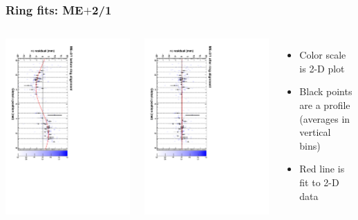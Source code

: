 \documentclass[compress]{beamer}
\begin{document}
\begin{frame}
\frametitle{Ring fits: ME$+$2/1}
\vfill
\begin{columns}
\includegraphics[height=\linewidth, angle=90]{ringfits_before/mep21.pdf}

\includegraphics[height=\linewidth, angle=90]{ringfits_after/mep21.pdf}
\begin{itemize}
\item Color scale is 2-D plot
\item Black points are a profile (averages in vertical bins)
\item Red line is fit to 2-D data
\end{itemize}
\end{columns}
\end{frame}
\end{document}
